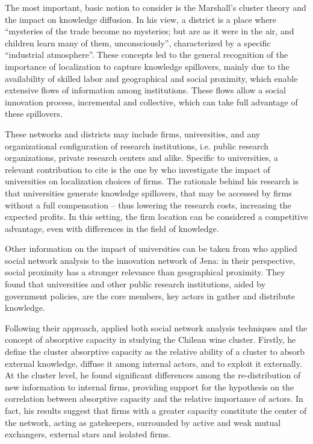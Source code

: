 The most important, basic notion to consider is the Marshall's cluster theory \citep{Marshall1890} and the impact on knowledge diffusion. In his view, a district is a place where \enquote{mysteries of the trade become no mysteries; but are as it were in the air, and children learn many of them, unconsciously}, characterized by a specific \enquote{industrial atmosphere}. These concepts led to the general recognition of the importance of localization to capture knowledge spillovers, mainly due to the availability of skilled labor and geographical and social proximity, which enable extensive flows of information among institutions. These flows allow a social innovation process, incremental and collective, which can take full advantage of these spillovers.

These networks and districts may include firms, universities, and any organizational configuration of research institutions, i.e. public research organizations, private research centers and alike. Specific to universities, a relevant contribution to cite is the one by \citet{Audretsch2004} who investigate the impact of universities on localization choices of firms. The rationale behind his research is that universities generate knowledge spillovers, that may be accessed by firms without a full compensation – thus lowering the research costs, increasing the expected profits. In this setting, the firm location can be considered a competitive advantage, even with differences in the field of knowledge. 

Other information on the impact of universities can be taken from \citet{Cantner2006} who applied social network analysis to the innovation network of Jena: in their perspective, social proximity has a stronger relevance than geographical proximity. They found that universities and other public research institutions, aided by government policies, are the core members, key actors in gather and distribute knowledge.

Following their approach, \citet{Giuliani2005} applied both social network analysis techniques and the concept of absorptive capacity in studying the Chilean wine cluster. Firstly, he define the cluster absorptive capacity as the relative ability of a cluster to absorb external knowledge, diffuse it among internal actors, and to exploit it externally. At the cluster level, he found significant differences among the re-distribution of new information to internal firms, providing support for the hypothesis on the correlation between absorptive capacity and the relative importance of actors. In fact, his results suggest that firms with a greater capacity constitute the center of the network, acting as gatekeepers, surrounded by active and weak mutual exchangers, external stars and isolated firms.


